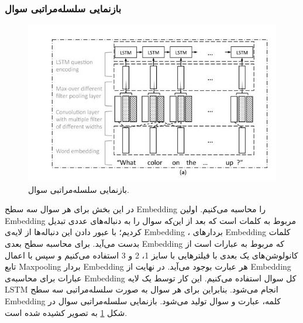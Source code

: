 {{		\subsubsection{بازنمایی سلسله‌مراتبی سوال}
		{
			\begin{figure}
				\centering
				\includegraphics[scale=0.5]{images/hierarchical.jpg}
				\caption{بازنمایی سلسله‌مراتبی سوال.}
				\label{fig:4}
			\end{figure}
		
			در این بخش برای هر سوال سه سطح Embedding را محاسبه می‌کنیم. اولین Embedding مربوط به کلمات است که بعد از این‌که سوال را به دنباله‌های عددی تبدیل کردیم؛ با عبور دادن این دنباله‌ها از لایه‌ی Embedding ، بردارهای Embedding‌ کلمات بدست می‌آید. برای محاسبه سطح بعدی Embedding که مربوط به عبارات است از کانولوشن‌های یک بعدی با فیلترهایی با سایز 1، 2 و 3 استفاده می‌کنیم و سپس با اعمال تابع Maxpooling بردار Embedding هر عبارت بوجود می‌آید. در نهایت از Embedding عبارات  برای محاسبه‌ی Embedding  کل سوال استفاده می‌کنیم. این کار توسط یک لایه LSTM انجام می‌شود. بنابراین  برای هر سوال به صورت سلسله‌مراتبی سه سطح Embedding کلمه، عبارت و سوال تولید می‌شود. بازنمایی سلسله‌مراتبی سوال در شکل
			\ref{fig:4}
			 به تصویر کشیده شده است.
		}
}}
